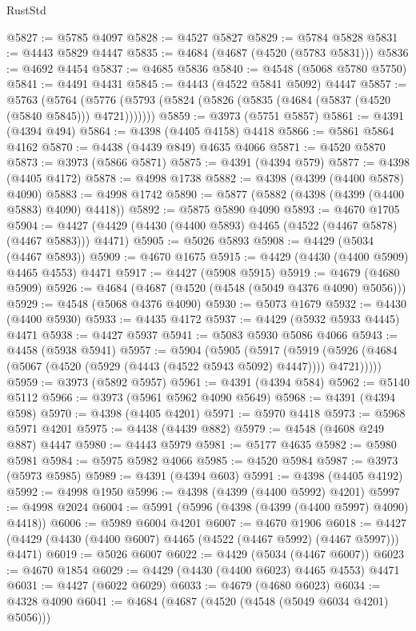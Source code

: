 \begin{lexlean}{RustStd}
\begin{coremodule}
{\begin{coremodule}
{{{{{{{{{{{{{{{{{{{{{{{{{{{{{{{{{{{{{{{{{{{{{{{{{{{{{{{{{{{{{{{{{{{{@5827 := @5785 @4097
@5828 := @4527 @5827
@5829 := @5784 @5828
@5831 := @4443 @5829 @4447
@5835 := @4684 (@4687 (@4520 (@5783 @5831)))
@5836 := @4692 @4454
@5837 := @4685 @5836
@5840 := @4548 (@5068 @5780 @5750)
@5841 := @4491 @4431
@5845 := @4443 (@4522 @5841 @5092) @4447
@5857 := @5763
    (@5764 (@5776 (@5793 (@5824 (@5826 (@5835 (@4684 (@5837 (@4520 (@5840 @5845))) @4721)))))))
@5859 := @3973 (@5751 @5857)
@5861 := @4391 (@4394 @494)
@5864 := @4398 (@4405 @4158) @4418
@5866 := @5861 @5864 @4162
@5870 := @4438 (@4439 @849) @4635 @4066
@5871 := @4520 @5870
@5873 := @3973 (@5866 @5871)
@5875 := @4391 (@4394 @579)
@5877 := @4398 (@4405 @4172)
@5878 := @4998 @1738
@5882 := @4398 (@4399 (@4400 @5878) @4090)
@5883 := @4998 @1742
@5890 := @5877 (@5882 (@4398 (@4399 (@4400 @5883) @4090) @4418))
@5892 := @5875 @5890 @4090
@5893 := @4670 @1705
@5904 := @4427 (@4429 (@4430 (@4400 @5893) @4465 (@4522 (@4467 @5878) (@4467 @5883))) @4471)
@5905 := @5026 @5893
@5908 := @4429 (@5034 (@4467 @5893))
@5909 := @4670 @1675
@5915 := @4429 (@4430 (@4400 @5909) @4465 @4553) @4471
@5917 := @4427 (@5908 @5915)
@5919 := @4679 (@4680 @5909)
@5926 := @4684 (@4687 (@4520 (@4548 (@5049 @4376 @4090) @5056)))
@5929 := @4548 (@5068 @4376 @4090)
@5930 := @5073 @1679
@5932 := @4430 (@4400 @5930)
@5933 := @4435 @4172
@5937 := @4429 (@5932 @5933 @4445) @4471
@5938 := @4427 @5937
@5941 := @5083 @5930 @5086 @4066
@5943 := @4458 (@5938 @5941)
@5957 := @5904
    (@5905
      (@5917
        (@5919 (@5926 (@4684 (@5067 (@4520 (@5929 (@4443 (@4522 @5943 @5092) @4447)))) @4721)))))
@5959 := @3973 (@5892 @5957)
@5961 := @4391 (@4394 @584)
@5962 := @5140 @5112
@5966 := @3973 (@5961 @5962 @4090 @5649)
@5968 := @4391 (@4394 @598)
@5970 := @4398 (@4405 @4201)
@5971 := @5970 @4418
@5973 := @5968 @5971 @4201
@5975 := @4438 (@4439 @882)
@5979 := @4548 (@4608 @249 @887) @4447
@5980 := @4443 @5979
@5981 := @5177 @4635
@5982 := @5980 @5981
@5984 := @5975 @5982 @4066
@5985 := @4520 @5984
@5987 := @3973 (@5973 @5985)
@5989 := @4391 (@4394 @603)
@5991 := @4398 (@4405 @4192)
@5992 := @4998 @1950
@5996 := @4398 (@4399 (@4400 @5992) @4201)
@5997 := @4998 @2024
@6004 := @5991 (@5996 (@4398 (@4399 (@4400 @5997) @4090) @4418))
@6006 := @5989 @6004 @4201
@6007 := @4670 @1906
@6018 := @4427 (@4429 (@4430 (@4400 @6007) @4465 (@4522 (@4467 @5992) (@4467 @5997))) @4471)
@6019 := @5026 @6007
@6022 := @4429 (@5034 (@4467 @6007))
@6023 := @4670 @1854
@6029 := @4429 (@4430 (@4400 @6023) @4465 @4553) @4471
@6031 := @4427 (@6022 @6029)
@6033 := @4679 (@4680 @6023)
@6034 := @4328 @4090
@6041 := @4684 (@4687 (@4520 (@4548 (@5049 @6034 @4201) @5056)))
}}}}}}}}}}}}}}}}}}}}}}}}}}}}}}}}}}}}}}}}}}}}}}}}}}}}}}}}}}}}}}}}}}}}
\end{coremodule}}
\end{coremodule}
\end{lexlean}
